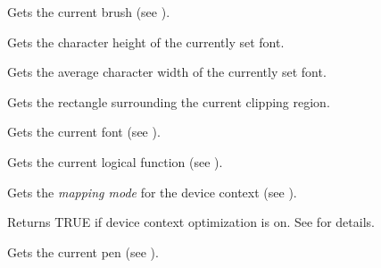 \label{wxdcgetbrush}


Gets the current brush (see ).

\label{wxdcgetcharheight}


Gets the character height of the currently set font.

\label{wxdcgetcharwidth}


Gets the average character width of the currently set font.

\label{wxdcgetclippingbox}


Gets the rectangle surrounding the current clipping region.

\label{wxdcgetfont}


Gets the current font (see ).

\label{wxdcgetlogicalfunction}


Gets the current logical function (see ).

\label{wxdcgetmapmode}


Gets the {\it mapping mode} for the device context (see ).

\label{wxdcgetoptimization}


Returns TRUE if device context optimization is on.
See  for details.

\label{wxdcgetpen}


Gets the current pen (see ).

